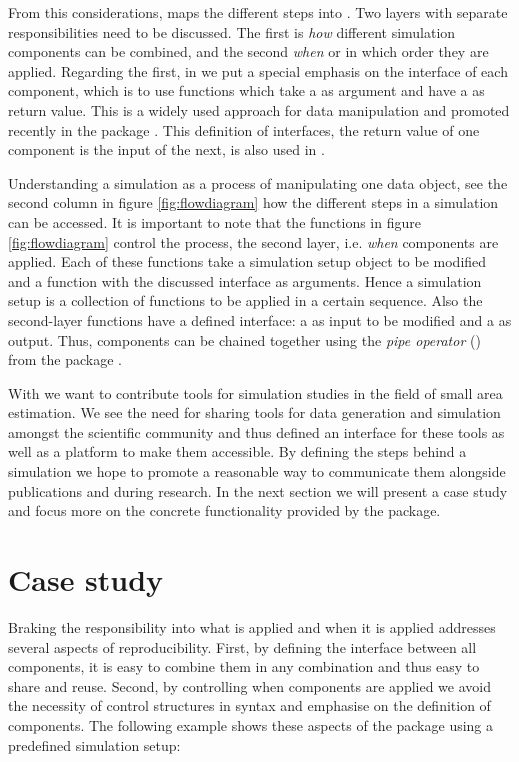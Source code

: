\documentclass[article]{ajs}
\begin{document}
From this considerations,  maps the different steps into . Two layers with separate responsibilities need to be discussed. The first is \textit{how} different simulation components can be combined, and the second \textit{when} or in which order they are applied. Regarding the first, in  we put a special emphasis on the interface of each component, which is to use functions which take a  as argument and have a  as return value. This is a widely used approach for data manipulation and promoted recently in the package  \citep{wickham14}. This definition of interfaces, the return value of one component is the input of the next, is also used in .

Understanding a simulation as a process of manipulating one data object, see the second column in figure \ref{fig:flowdiagram} how the different steps in a simulation can be accessed. It is important to note that the functions in figure \ref{fig:flowdiagram} control the process, the second layer, i.e. \textit{when} components are applied. Each of these functions take a simulation setup object to be modified and a function with the discussed interface as arguments. Hence a simulation setup is a collection of functions to be applied in a certain sequence. Also the second-layer functions have a defined interface: a  as input to be modified and a  as output. Thus, components can be chained together using the \textit{pipe operator} (\proglang{\%>\%}) from the package  \citep{bache14}.

With  we want to contribute tools for simulation studies in the field of small area estimation. We see the need for sharing tools for data generation and simulation amongst the scientific community and thus defined an interface for these tools as well as a platform to make them accessible. By defining the steps behind a simulation we hope to promote a reasonable way to communicate them alongside publications and during research. In the next section we will present a case study and focus more on the concrete functionality provided by the package.

\section{Case study}
Braking the responsibility into what is applied and when it is applied addresses several aspects of reproducibility. First, by defining the interface between all components, it is easy to combine them in any combination and thus easy to share and reuse. Second, by controlling when components are applied we avoid the necessity of control structures in syntax and emphasise on the definition of components. The following example shows these aspects of the package using a predefined simulation setup:
\end{document}
